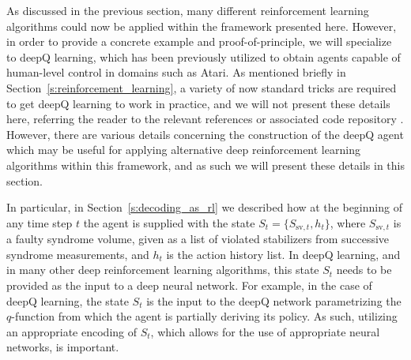 \documentclass[twocolumn,preprintnumbers,amsmath,amssymb,notitlepage,nofootinbib,longbibliography,superscriptaddress,aps,pra,10pt]{revtex4-1}
\begin{document}
	As discussed in the previous section, many different reinforcement learning algorithms could now be applied within the framework presented here. 
	However, in order to provide a concrete example and proof-of-principle, we will specialize to deepQ learning, which has been previously utilized to obtain agents capable of human-level control in domains such as Atari.
	As mentioned briefly in Section~\ref{s:reinforcement_learning}, a variety of now standard tricks are required to get deepQ learning to work in practice, and we will not present these details here, referring the reader to the relevant references \cite{RLMnih15,RLvan2016deep,RLschaul2015prioritized,RLwang2015dueling} or associated code repository \cite{DeepQDecoding}.
	However, there are various details concerning the construction of the deepQ agent which may be useful for applying alternative deep reinforcement learning algorithms within this framework, and as such we will present these details in this section.

	In particular, in Section~\ref{s:decoding_as_rl} we described how at the beginning of any time step $t$ the agent is supplied with the state $S_{t}=\{S_{\mathrm{sv},{t}},h_{t}\}$, where $S_{\mathrm{sv},{t}}$ is a faulty syndrome volume, given as a list of violated stabilizers from successive syndrome measurements, and $h_{t}$ is the action history list.
	In deepQ learning, and in many other deep reinforcement learning algorithms, this state $S_t$ needs to be provided as the input to a deep neural network.
	For example, in the case of deepQ learning, the state $S_t$ is the input to the deepQ network parametrizing the $q$-function from which the agent is partially deriving its policy.
	As such, utilizing an appropriate encoding of $S_t$, which allows for the use of appropriate neural networks, is important.
\end{document}
